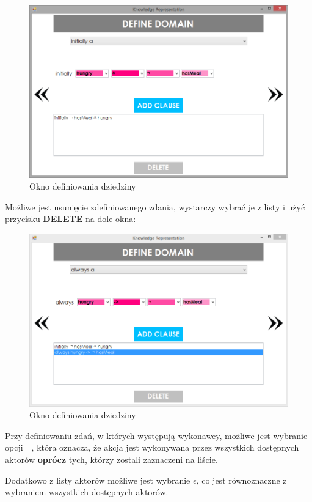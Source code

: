 \documentclass{article}
\begin{document}
\begin{figure}[H]
\centering
\includegraphics[scale=0.4]{08}
\caption{Okno definiowania dziedziny}
\end{figure}


Możliwe jest usunięcie zdefiniowanego zdania, wystarczy wybrać je z listy i użyć przycisku \textbf{DELETE} na dole okna:

\begin{figure}[H]
\centering
\includegraphics[scale=0.4]{09}
\caption{Okno definiowania dziedziny}
\end{figure}

\newpage
Przy definiowaniu zdań, w których występują wykonawcy, możliwe jest wybranie opcji {\large{$\neg$}}, która oznacza, że akcja jest wykonywana przez wszystkich dostępnych aktorów \textbf{oprócz} tych, którzy zostali zaznaczeni na liście. 

Dodatkowo z listy aktorów możliwe jest wybranie $\epsilon$, co jest równoznaczne z wybraniem wszystkich dostępnych aktorów. 
\end{document}
